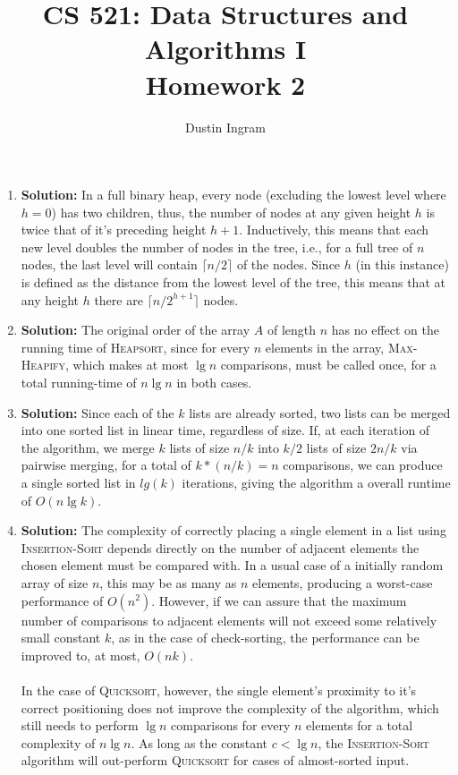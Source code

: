 \documentclass{article}
\title{CS 521: Data Structures and Algorithms I \\ Homework 2}
\author{Dustin Ingram}
\begin{document}
\maketitle
\begin{enumerate}
\item \textbf{Solution:} In a full binary heap, every node (excluding the lowest level where $h=0$) has two children, thus, the number of nodes at any given height $h$ is twice that of it's preceding height $h+1$. Inductively, this means that each new level doubles the number of nodes in the tree, i.e., for a full tree of $n$ nodes, the last level will contain $\lceil n/2 \rceil$ of the nodes. Since $h$ (in this instance) is defined as the distance from the lowest level of the tree, this means that at any height $h$ there are $\lceil n/2^{h+1} \rceil$ nodes.

\item \textbf{Solution:} The original order of the array $A$ of length $n$ has no effect on the running time of \textsc{Heapsort}, since for every $n$ elements in the array, \textsc{Max-Heapify}, which makes at most $\lg{n}$ comparisons, must be called once, for a total running-time of $n\lg{n}$ in both cases.  

\item \textbf{Solution:} Since each of the $k$ lists are already sorted, two lists can be merged into one sorted list in linear time, regardless of size. If, at each iteration of the algorithm, we merge $k$ lists of size $n/k$ into $k/2$ lists of size $2n/k$ via pairwise merging, for a total of $k*(n/k) = n$ comparisons, we can produce a single sorted list in $lg(k)$ iterations, giving the algorithm a overall runtime of $O(n\lg{k})$.  

\item \textbf{Solution:} The complexity of correctly placing a single element in a list using \textsc{Insertion-Sort} depends directly on the number of adjacent elements the chosen element must be compared with. In a usual case of a initially random array of size $n$, this may be as many as $n$ elements, producing a worst-case performance of $O(n^{2})$. However, if we can assure that the maximum number of comparisons to adjacent elements will not exceed some relatively small constant $k$, as in the case of check-sorting, the performance can be improved to, at most, $O(nk)$. \\ \\
In the case of \textsc{Quicksort}, however, the single element's proximity to it's correct positioning does not improve the complexity of the algorithm, which still needs to perform $\lg{n}$ comparisons for every $n$ elements for a total complexity of $n\lg{n}$. As long as the constant $c < \lg{n}$, the \textsc{Insertion-Sort} algorithm will out-perform \textsc{Quicksort} for cases of almost-sorted input.


\end{enumerate}
\end{document}
